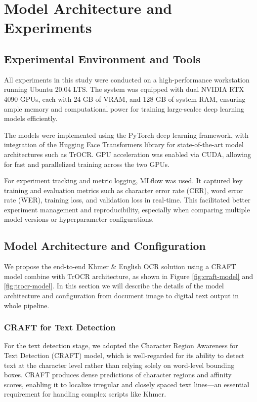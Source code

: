 \chapter{Model Architecture and Experiments}
\label{ch:experiments}

\section{Experimental Environment and Tools}
\label{sec:environment}
All experiments in this study were conducted on a high-performance workstation running 
Ubuntu 20.04 LTS. The system was equipped with dual NVIDIA RTX 4090 GPUs, each with 
24 GB of VRAM, and 128 GB of system RAM, ensuring ample memory and computational power 
for training large-scalec deep learning models efficiently.

The models were implemented using the PyTorch deep learning framework, with integration of the Hugging Face Transformers library for state-of-the-art model architectures such as TrOCR. GPU acceleration was enabled via CUDA, allowing for fast and parallelized training across the two GPUs.

For experiment tracking and metric logging, MLflow was used. It captured key training 
and evaluation metrics such as character error rate (CER), word error rate (WER), 
training loss, and validation loss in real-time. This facilitated better experiment 
management and reproducibility, especially when comparing multiple model versions or 
hyperparameter configurations.



\section{Model Architecture and Configuration}
\label{sec:architecture}
We propose the end-to-end Khmer \& English OCR solution using a CRAFT model combine
with TrOCR architecture, as shown in Figure \ref{fig:craft-model} and \ref{fig:trocr-model}.
In this section we will describe the details of the model architecture and configuration
from document image to digital text output in whole pipeline.

\subsection{CRAFT for Text Detection}
\label{subsec:craft}

For the text detection stage, we adopted the Character Region Awareness for Text 
Detection (CRAFT) model, which is well-regarded for its ability to detect text at 
the character level rather than relying solely on word-level bounding boxes. 
CRAFT produces dense predictions of character regions and affinity scores, 
enabling it to localize irregular and closely spaced text lines—an essential 
requirement for handling complex scripts like Khmer.

